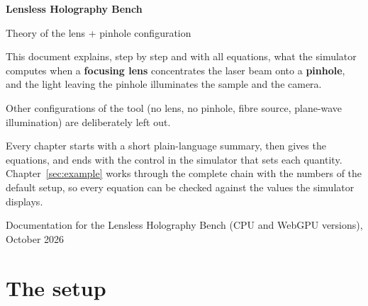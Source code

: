 \documentclass[12pt,a4paper]{article}
\begin{document}
\begin{titlepage}
\vspace*{3cm}
{\sffamily\bfseries\Huge\color{MidnightBlue} Lensless Holography Bench\par}
\vspace{6pt}
{\sffamily\Large Theory of the lens + pinhole configuration\par}
\vspace{1.2cm}
\begin{minipage}{0.86\linewidth}
\large
This document explains, step by step and with all equations, what the simulator computes when a
\textbf{focusing lens} concentrates the laser beam onto a \textbf{pinhole}, and the light leaving the
pinhole illuminates the sample and the camera.

Other configurations of the tool (no lens, no pinhole, fibre source, plane-wave illumination) are
deliberately left out.

Every chapter starts with a short plain-language summary, then gives the equations, and ends with the
control in the simulator that sets each quantity. Chapter~\ref{sec:example} works through the complete
chain with the numbers of the default setup, so every equation can be checked against the values the
simulator displays.
\end{minipage}
\vfill
{\sffamily Documentation for the Lensless Holography Bench (CPU and WebGPU versions), October 2026\par}
\end{titlepage}

\tableofcontents
\newpage

\section{The setup}
\label{sec:setup}
\end{document}

